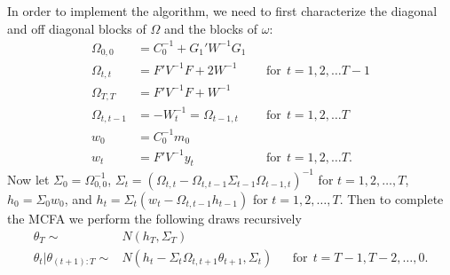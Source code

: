 \documentclass[graybox]{svmult}
\begin{document}
In order to implement the algorithm, we need to first characterize the diagonal and off diagonal blocks of $\Omega$ and the blocks of $\omega$:
\begin{align*}
  \Omega_{0,0} & = C_0^{-1} + G_1'W^{-1}G_1 && \\
  \Omega_{t,t} & = F'V^{-1}F + 2W^{-1} &&  \mathrm{ for }\ \  t=1,2,\dots T-1\\
  \Omega_{T,T} & = F'V^{-1}F + W^{-1} && \\
  \Omega_{t,t-1} & = - W_t^{-1}=\Omega_{t-1,t} &&  \mathrm{ for }\ \  t=1,2,\dots T\\
  w_0 & = C_0^{-1}m_0 &&\\
  w_t &= F'V^{-1}y_t &&  \mathrm{ for }\ \  t=1,2,\dots T.
\end{align*}
Now let $\Sigma_0 = \Omega_{0,0}^{-1}$, $\Sigma_t = (\Omega_{t,t} - \Omega_{t,t-1}\Sigma_{t-1}\Omega_{t-1,t})^{-1}$ for $t=1,2,\dots,T$, $h_0 = \Sigma_0w_0$, and $h_t = \Sigma_t(w_t - \Omega_{t,t-1}h_{t-1})$ for $t=1,2,\dots,T$. Then to complete the MCFA we perform the following draws recursively
\begin{align*}
  \theta_T \sim & N(h_T, \Sigma_T) &&\\
  \theta_{t}|\theta_{(t+1):T} \sim & N(h_t - \Sigma_t\Omega_{t,t+1}\theta_{t+1}, \Sigma_t) && \mathrm{for}\ \ t=T-1,T-2,\dots,0.
\end{align*}
\end{document}
